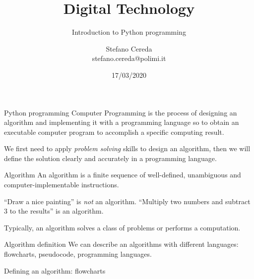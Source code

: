 \documentclass[aspectratio=169,]{beamer}
\title{Digital Technology}
\subtitle{Introduction to Python programming}
\author{Stefano Cereda\\
		stefano.cereda@polimi.it
	}
\date{17/03/2020}
\institute[PoliMi]{Politecnico Milano}
\begin{document}
\begin{frame}
	\maketitle
\end{frame}

\begin{frame}{Python programming}
    Computer Programming is the process of designing an \alert{algorithm} and implementing it with a
    \alert{programming language} so to obtain an executable computer program to accomplish a specific computing result.

    We first need to apply \emph{problem solving} skills to design an algorithm, then we will define the solution
    clearly and accurately in a programming language.
\end{frame}

\begin{frame}{Algorithm}
    An algorithm is a \alert{finite sequence of well-defined, unambiguous and computer-implementable instructions}.

    ``Draw a nice painting'' is \emph{not} an algorithm.
    ``Multiply two numbers and subtract 3 to the results'' is an algorithm.

    Typically, an algorithm solves a class of problems or performs a computation.
\end{frame}

\begin{frame}{Algorithm definition}
    We can describe an algorithms with different languages: flowcharts, pseudocode, programming languages.
\end{frame}

\begin{frame}{Defining an algorithm: flowcharts}
\end{frame}
\end{document}
